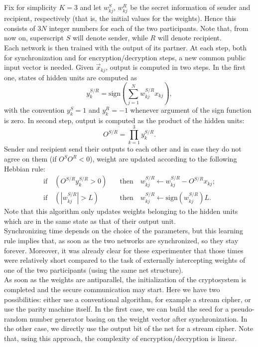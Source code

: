\documentclass[%
    corpo=11pt,
    twoside,
    stile=classica,
    oldstyle,
    autoretitolo,
    tipotesi=magistrale,
    greek,
    evenboxes,
    english
]{toptesi}
\newcommand{\sign}{\text{sign}}
\begin{document}
Fix for simplicity $K = 3$ and let $w_{kj}^S$, $w_{kj}^R$ be the secret information of sender and recipient, respectively (that is, the initial values for the weights). Hence this consists of $3N$ integer numbers for each of the two participants.  Note that, from now on, superscript $S$ will denote sender, while $R$ will denote recipient. \\
Each network is then trained with the output of its partner. At each step, both for synchronization and for encryption/decryption steps, a new common public input vector is needed. Given $\vec{x}_{kj}$, output is computed in two steps. In the first one, states of hidden units are computed as 
\begin{equation}
y_k^{S/R} = \sign\left(\sum_{j=1}^{N}w_{kj}^{S/R}x_{kj}\right),
\end{equation}
with the convention $y_k^S = 1$ and $y_k^R = -1$ whenever argument of the sign function is zero. In second step, output is computed as the product of the hidden units:
\begin{equation}
O^{S/R} = \prod_{k=1}^{3}y_k^{S/R}.
\end{equation} 
Sender and recipient send their outputs to each other and in case they do not agree on them (if $O^SO^R<0$), weight are updated according to the following Hebbian rule:
\begin{align}
\text{if} \quad \left(O^{S/R}y_k^{S/R}>0\right) \quad &\text{then} \quad w_{kj}^{S/R} \leftarrow w_{kj}^{S/R} -O^{S/R} x_{kj}; \nonumber \\
\text{if} \quad \left(|w_{kj}^{S/R}|>L\right) \quad &\text{then} \quad w_{kj}^{S/R} \leftarrow \sign\left(w_{kj}^{S/R}\right)L.
\label{hebblearn}
\end{align}
Note that this algorithm only updates weights belonging to the hidden units which are in the same state as that of their output unit. \\
Synchronizing time depends on the choice of the parameters, but this learning rule implies that, as soon as the two networks are synchronized, so they stay forever. Moreover, it was already clear for these experimenter that those times were relatively short compared to the task of externally intercepting weights of one of the two participants (using the same net structure). \\
As soon as the weights are antiparallel, the initialization of the cryptosystem is completed and the secure communication may start. Here we have two possibilities: either use a conventional algorithm, for example a stream cipher, or use the parity machine itself. In the first case, we can build the seed for a pseudo-random number generator basing on the weight vector after synchronization. In the other case, we directly use the output bit of the net for a stream cipher. Note that, using this approach, the complexity of encryption/decryption is linear. 
\end{document}
